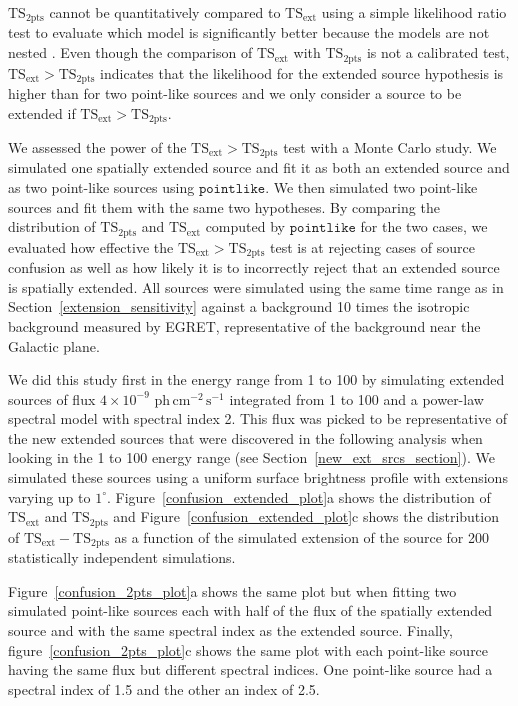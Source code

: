 \documentclass[12pt,preprint]{aastex}
\newcommand{\gev}{\text{GeV}\xspace}
\newcommand{\phflux}{\ensuremath{\text{ph}\,\text{cm}^{-2}\,\text{s}^{-1}}\xspace}
\newcommand{\tsext}{{\ensuremath{\text{TS}_{\text{ext}}}}\xspace}
\newcommand{\tsinc}{\ensuremath{\text{TS}_{\text{2pts}}}\xspace}
\newcommand{\pointlike}{\ensuremath{\mathtt{pointlike}}\xspace}
\newcommand{\degree}{^\circ\xspace}
\begin{document}
\tsinc cannot be quantitatively compared to \tsext using a simple
likelihood ratio test to evaluate which model is significantly better
because the models are not nested \citep{statistics_with_care}.
Even though the comparison of \tsext with \tsinc is not a calibrated
test, $\tsext>\tsinc$ indicates that the likelihood for the extended
source hypothesis is higher than for two point-like sources and we only
consider a source to be extended if $\tsext>\tsinc$.

We assessed the power of the $\tsext>\tsinc$ test with a Monte Carlo
study.  We simulated one spatially extended source and fit it as both
an extended source and as two point-like sources using \pointlike.
We then simulated two point-like sources and fit them with the same two
hypotheses. By comparing the distribution of \tsinc and \tsext computed by
\pointlike for the two cases, we evaluated how effective the $\tsext>\tsinc$
test is at rejecting cases of source confusion as well as how
likely it is to incorrectly reject that an extended source is spatially
extended.  All sources were simulated using the same time range as in
Section~\ref{extension_sensitivity} against a background 10 times the
isotropic background measured by EGRET, representative of the background
near the Galactic plane.

We did this study first in the energy range from 1 \gev to 100 \gev by
simulating extended sources of flux $4\times10^{-9}$ \phflux integrated
from 1 \gev to 100 \gev and a power-law spectral model with
spectral index 2.  This flux was picked to be representative of the
new extended sources that were discovered in the following analysis
when looking in the 1 \gev to 100 \gev energy range
(see Section~\ref{new_ext_srcs_section}).
We simulated these sources using a uniform surface brightness profile
with extensions varying
up to $1\degree$.  
Figure~\ref{confusion_extended_plot}a shows the distribution
of \tsext and \tsinc and 
Figure~\ref{confusion_extended_plot}c shows 
the distribution of $\tsext-\tsinc$ as a
function of the simulated extension of the source
for 200 statistically independent simulations.


Figure~\ref{confusion_2pts_plot}a shows the same plot but when fitting
two simulated point-like sources each with half of the flux of
the spatially extended source and with the same spectral index as the
extended source.  Finally, figure~\ref{confusion_2pts_plot}c shows the same
plot with each point-like source having the same flux but different
spectral indices.  One point-like source had a spectral index of 1.5
and the other an index of 2.5.
\end{document}
